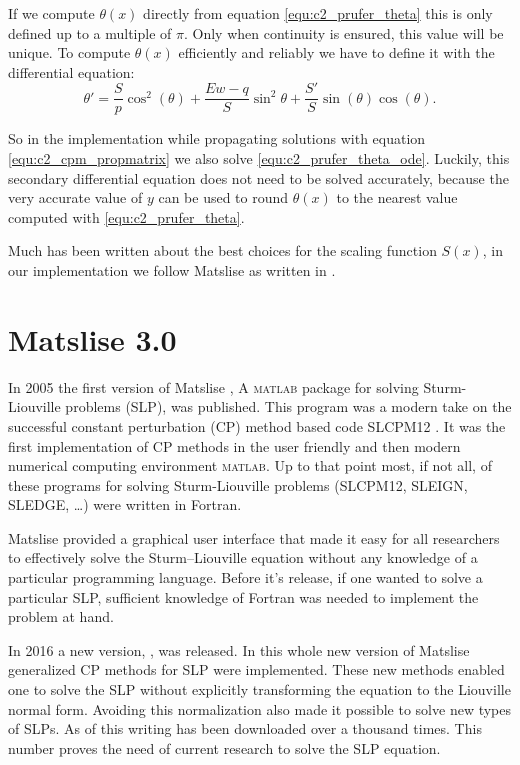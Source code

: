 If we compute $\theta(x)$ directly from equation \eqref{equ:c2_prufer_theta} this is only defined up to a multiple of $\pi$. Only when continuity is ensured, this value will be unique. To compute $\theta(x)$ efficiently and reliably we have to define it with the differential equation:
\begin{equation}\label{equ:c2_prufer_theta_ode}
    \theta' = \frac{S}{p} \cos^2(\theta) + \frac{Ew - q}{S}\sin^2\theta + \frac{S'}{S}\sin(\theta)\cos(\theta)\text{.}
\end{equation}

So in the implementation while propagating solutions with equation \eqref{equ:c2_cpm_propmatrix} we also solve \eqref{equ:c2_prufer_theta_ode}. Luckily, this secondary differential equation does not need to be solved accurately, because the very accurate value of $y$ can be used to round $\theta(x)$ to the nearest value computed with \eqref{equ:c2_prufer_theta}.

Much has been written about the best choices for the scaling function $S(x)$, in our implementation we follow Matslise as written in \cite{ledoux_study_2007}.

\section{Matslise 3.0}

In 2005 the first version of Matslise \cite{ledoux_matslise_2005}, A \textsc{matlab} package for solving Sturm-Liouville problems (SLP), was published. This program was a modern take on the successful
constant perturbation (CP) method based code SLCPM12 \cite{ixaru_slcpm12_1999}. It was the first implementation of CP
methods in the user friendly and then modern numerical computing environment \textsc{matlab}. Up to that
point most, if not all, of these programs for solving Sturm-Liouville problems (SLCPM12, SLEIGN, SLEDGE, \ldots) \cite{ixaru_slcpm12_1999,bailey_sleign2_2001,eastham_sledge_1996}
were written in Fortran.

Matslise provided a graphical user interface that made it easy for all
researchers to effectively solve the
Sturm--Liouville equation without any knowledge of a particular programming language. Before it's release, if one wanted to solve
a particular SLP, sufficient knowledge of Fortran was needed to implement the problem at hand.

In 2016 a new version,  \cite{ledoux_matslise_2016}, was released. In this whole new version of Matslise generalized CP methods for SLP were implemented. These new methods enabled one to solve the SLP without explicitly transforming the equation to the Liouville normal form. Avoiding this normalization also made it possible to solve new types of SLPs. As of this writing  has been downloaded over a thousand times. This number proves the need of current research to solve the SLP equation.


